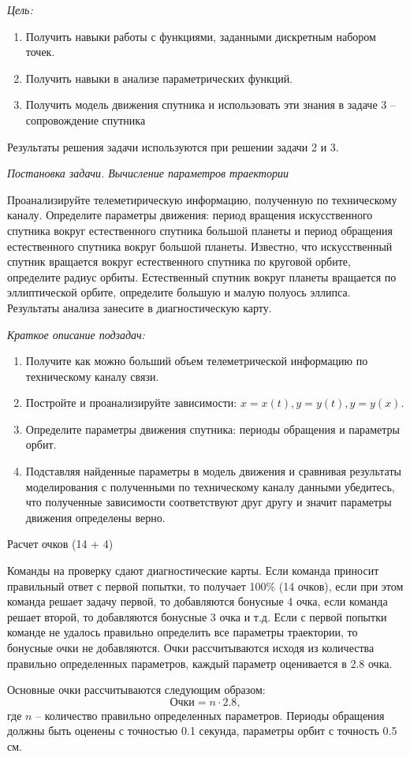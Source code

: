 
\textit{Цель:}

\begin{enumerate}
    \item Получить навыки работы с функциями, заданными дискретным набором точек.
    \item Получить навыки в анализе параметрических функций.
    \item Получить модель движения спутника и использовать эти знания в задаче 3 – сопровождение спутника
\end{enumerate}

Результаты решения задачи используются при решении задачи 2 и 3.

\textit{Постановка задачи. Вычисление параметров траектории}

Проанализируйте телеметирическую информацию, полученную по техническому каналу. Определите параметры движения: период вращения искусственного спутника вокруг естественного спутника большой планеты и период обращения естественного спутника вокруг большой планеты. Известно, что искусственный спутник вращается вокруг естественного спутника по круговой орбите, определите радиус орбиты. Естественный спутник вокруг планеты вращается по эллиптической орбите, определите большую и малую полуось эллипса. Результаты анализа занесите в диагностическую карту.

\textit{Краткое описание подзадач:}

\begin{enumerate}
    \item Получите как можно больший объем телеметрической информацию по техническому каналу связи.
    \item Постройте и проанализируйте зависимости: $x = x(t), y = y(t), y = y(x)$.
    \item Определите параметры движения спутника: периоды обращения и параметры орбит.
    \item Подставляя найденные параметры в модель движения и сравнивая результаты моделирования с полученными по техническому каналу данными убедитесь, что полученные зависимости соответствуют друг другу и значит параметры движения определены верно.
\end{enumerate}

\markSection

Расчет очков (14 + 4)

Команды на проверку сдают диагностические карты. Если команда приносит правильный ответ с первой попытки, то получает 100\% (14 очков), если при этом команда решает задачу первой, то добавляются бонусные 4 очка, если команда решает второй, то добавляются бонусные 3 очка и т.д. Если с первой попытки команде не удалось правильно определить все параметры траектории, то бонусные очки не добавляются. Очки рассчитываются исходя из количества правильно определенных параметров, каждый параметр оценивается в 2.8 очка. 

Основные очки рассчитываются следующим образом:
$$\text{Очки} = n \cdot 2.8,$$
где $n$ – количество правильно определенных параметров. Периоды обращения должны быть оценены с точностью 0.1 секунда, параметры орбит с точность 0.5 см.